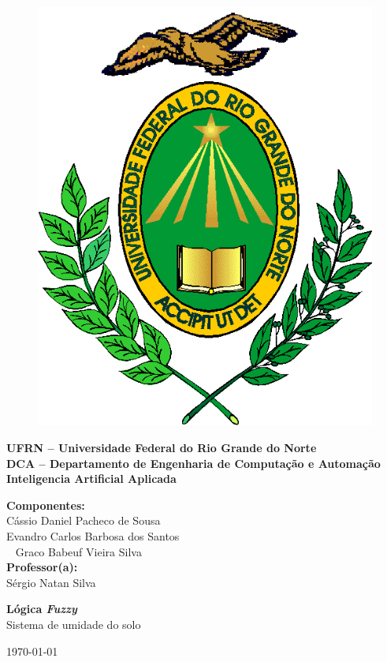 	\begin{titlepage}
		
		\begin{figure}[t]
			\centering
			\includegraphics[width=0.1\linewidth]{Capa/Figuras/LOGO}
			\label{fig:LOGO}
		\end{figure}

		
		
		\begin{center}
			\textbf{UFRN – Universidade Federal do Rio Grande do Norte\\
				DCA – Departamento de Engenharia de Computação e Automação\\
				Inteligencia Artificial Aplicada
					}
		\end{center}
		
		\vspace{1.5 cm}
		

			
\noindent \textbf{Componentes:} \\		
\noindent Cássio Daniel Pacheco de Sousa \\
Evandro Carlos Barbosa dos Santos\\\
\vspace{1.5 cm}
Graco Babeuf Vieira Silva \\
			
			
		
\noindent \textbf{Professor(a):}\\
\noindent Sérgio Natan Silva\\
			\vspace{3 cm}
			

		
		\begin{center}
			{\textbf{\huge Lógica \textit{Fuzzy}}}\\
			{\large{Sistema de umidade do solo}}\\
		\end{center}
		
		\vspace{6cm}
		\begin{center}
			\today
		\end{center}
		
	\end{titlepage}